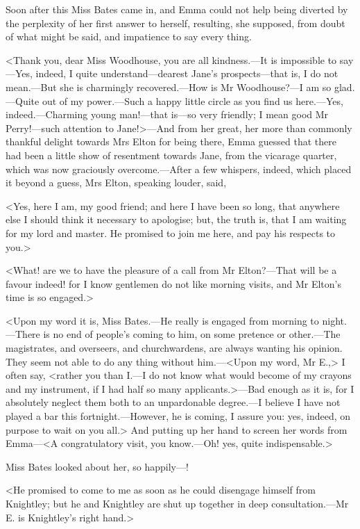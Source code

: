 Soon after this Miss Bates came in, and Emma could not help being diverted by the perplexity of her first answer to herself, resulting, she supposed, from doubt of what might be said, and impatience to say every thing.

<Thank you, dear Miss Woodhouse, you are all kindness.—It is impossible to say—Yes, indeed, I quite understand—dearest Jane's prospects—that is, I do not mean.—But she is charmingly recovered.—How is Mr Woodhouse?—I am so glad.—Quite out of my power.—Such a happy little circle as you find us here.—Yes, indeed.—Charming young man!—that is—so very friendly; I mean good Mr Perry!—such attention to Jane!>—And from her great, her more than commonly thankful delight towards Mrs Elton for being there, Emma guessed that there had been a little show of resentment towards Jane, from the vicarage quarter, which was now graciously overcome.—After a few whispers, indeed, which placed it beyond a guess, Mrs Elton, speaking louder, said,

<Yes, here I am, my good friend; and here I have been so long, that anywhere else I should think it necessary to apologise; but, the truth is, that I am waiting for my lord and master. He promised to join me here, and pay his respects to you.>

<What! are we to have the pleasure of a call from Mr Elton?—That will be a favour indeed! for I know gentlemen do not like morning visits, and Mr Elton's time is so engaged.>

<Upon my word it is, Miss Bates.—He really is engaged from morning to night.—There is no end of people's coming to him, on some pretence or other.—The magistrates, and overseers, and churchwardens, are always wanting his opinion. They seem not able to do any thing without him.—<Upon my word, Mr E.,> I often say, <rather you than I.—I do not know what would become of my crayons and my instrument, if I had half so many applicants.>—Bad enough as it is, for I absolutely neglect them both to an unpardonable degree.—I believe I have not played a bar this fortnight.—However, he is coming, I assure you: yes, indeed, on purpose to wait on you all.> And putting up her hand to screen her words from Emma—<A congratulatory visit, you know.—Oh! yes, quite indispensable.>

Miss Bates looked about her, so happily—!

<He promised to come to me as soon as he could disengage himself from Knightley; but he and Knightley are shut up together in deep consultation.—Mr E. is Knightley's right hand.>


